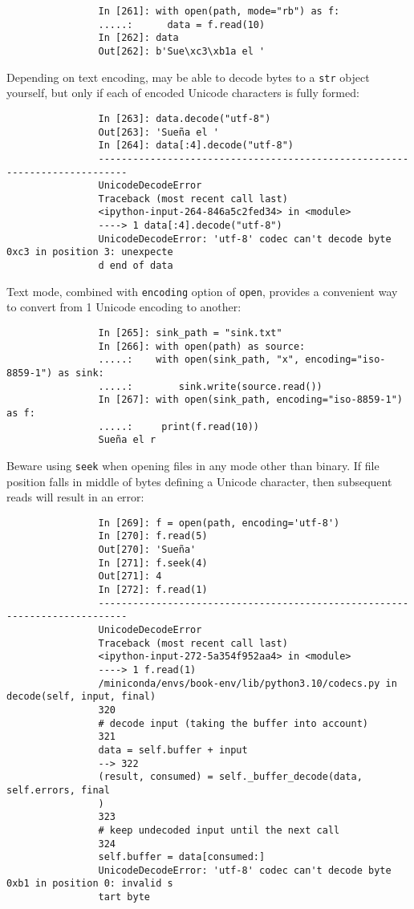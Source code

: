 \documentclass{article}
\begin{document}
\begin{itemize}
\begin{itemize}
\begin{itemize}
			\begin{verbatim}
				In [261]: with open(path, mode="rb") as f:
				.....:      data = f.read(10)
				In [262]: data
				Out[262]: b'Sue\xc3\xb1a el '
			\end{verbatim}
			Depending on text encoding, may be able to decode bytes to a {\tt str} object yourself, but only if each of encoded Unicode characters is fully formed:
			\begin{verbatim}
				In [263]: data.decode("utf-8")
				Out[263]: 'Sueña el '
				In [264]: data[:4].decode("utf-8")
				---------------------------------------------------------------------------
				UnicodeDecodeError
				Traceback (most recent call last)
				<ipython-input-264-846a5c2fed34> in <module>
				----> 1 data[:4].decode("utf-8")
				UnicodeDecodeError: 'utf-8' codec can't decode byte 0xc3 in position 3: unexpecte
				d end of data
			\end{verbatim}
			Text mode, combined with {\tt encoding} option of {\tt open}, provides a convenient way to convert from 1 Unicode encoding to another:
			\begin{verbatim}
				In [265]: sink_path = "sink.txt"
				In [266]: with open(path) as source:
				.....:    with open(sink_path, "x", encoding="iso-8859-1") as sink:
				.....:        sink.write(source.read())
				In [267]: with open(sink_path, encoding="iso-8859-1") as f:
				.....:     print(f.read(10))
				Sueña el r
			\end{verbatim}
			Beware using {\tt seek} when opening files in any mode other than binary. If file position falls in middle of bytes defining a Unicode character, then subsequent reads will result in an error:
			\begin{verbatim}
				In [269]: f = open(path, encoding='utf-8')
				In [270]: f.read(5)
				Out[270]: 'Sueña'
				In [271]: f.seek(4)
				Out[271]: 4
				In [272]: f.read(1)
				---------------------------------------------------------------------------
				UnicodeDecodeError
				Traceback (most recent call last)
				<ipython-input-272-5a354f952aa4> in <module>
				----> 1 f.read(1)
				/miniconda/envs/book-env/lib/python3.10/codecs.py in decode(self, input, final)
				320
				# decode input (taking the buffer into account)
				321
				data = self.buffer + input
				--> 322
				(result, consumed) = self._buffer_decode(data, self.errors, final
				)
				323
				# keep undecoded input until the next call
				324
				self.buffer = data[consumed:]
				UnicodeDecodeError: 'utf-8' codec can't decode byte 0xb1 in position 0: invalid s
				tart byte

\end{verbatim}
\end{itemize}
\end{itemize}
\end{itemize}
\end{document}

